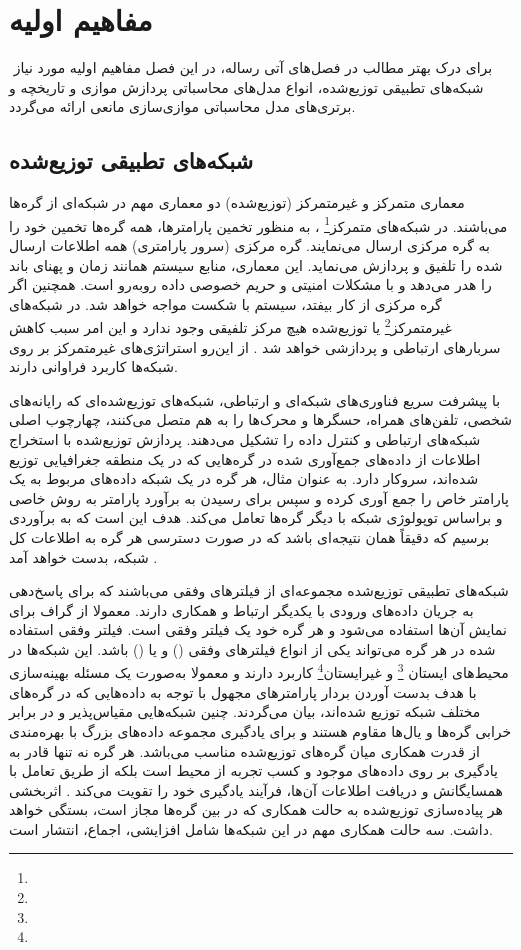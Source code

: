 \chapter{مفاهیم اولیه}
\newpage
‎\renewcommand{\baselinestretch}{2}\normalsize‎
\label{Basic concepts}
برای درک بهتر مطالب در فصل‌های آتی رساله، در این فصل مفاهیم اولیه مورد نیاز شبکه‌های تطبیقی توزیع‌شده، انواع مدل‌های محاسباتی پردازش موازی و تاریخچه و برتری‌های مدل محاسباتی موازی‌سازی مانعی ارائه می‌گردد. 


\section{شبکه‌های تطبیقی توزیع‌شده}
معماری متمرکز و غیرمتمرکز  (توزیع‌شده) دو معماری مهم در شبکه‌ای از گره‌ها می‌باشند. در شبکه‌های متمرکز\footnote{} ، به منظور تخمین پارامترها، همه گره‌ها تخمین خود را به گره مرکزی ارسال می‌نمایند. گره ‌مرکزی (سرور پارامتری) همه اطلاعات ارسال شده را تلفیق و پردازش می‌نماید. این معماری، منابع سیستم همانند زمان و پهنای باند را هدر می‌دهد و با مشکلات امنیتی و حریم خصوصی داده روبه‌رو است. همچنین اگر گره مرکزی از کار بیفتد، سیستم با شکست مواجه خواهد شد. در شبکه‌های غیرمتمرکز\footnote{} یا‌ توزیع‌شده هیچ مرکز تلفیقی وجود ندارد و این امر سبب کاهش سربارهای ارتباطی و پردازشی خواهد شد \cite{Sayed2013}. از این‌رو استراتژی‌های غیرمتمرکز بر روی شبکه‌ها کاربرد فراوانی دارند. 

با پیشرفت سریع فناوری‌های شبکه‌ای و ارتباطی، شبکه‌های توزیع‌شده‌ای که رایانه‌های شخصی، تلفن‌های همراه، حسگرها و محرک‌ها را به هم متصل می‌کنند، چهارچوب اصلی شبکه‌های ارتباطی و کنترل داده‌ را تشکیل می‌دهند. پردازش توزیع‌شده با استخراج اطلاعات از داده‌های جمع‌آوری شده در گره‌هایی که در یک منطقه جغرافیایی توزیع شده‌اند، سروکار دارد. به عنوان مثال، هر گره در یک شبکه داده‌های مربوط به یک پارامتر خاص را جمع آوری کرده و سپس برای رسیدن به برآورد پارامتر به روش خاصی و براساس توپولوژی شبکه با دیگر گره‌ها تعامل می‌کند. هدف این است که به برآوردی برسیم که دقیقاً همان نتیجه‌ای باشد که در صورت دسترسی هر گره به اطلاعات کل شبکه، بدست خواهد آمد \cite{Sayed2013}.  

شبکه‌های تطبیقی توزیع‌شده مجموعه‌ای از فیلترهای وفقی می‌باشند که برای پاسخ‌دهی به جریان داده‌های ورودی با یکدیگر ارتباط و همکاری دارند. معمولا از گراف برای نمایش آن‌ها استفاده می‌شود و هر گره خود یک فیلتر وفقی است. فیلتر وفقی استفاده شده در هر گره می‌تواند یکی از انواع فیلترهای وفقی  () و یا  () باشد. این شبکه‌ها در محیط‌های ایستان  \footnote{} و غیرایستان\footnote{}  کاربرد دارند و معمولا به‌صورت یک مسئله بهینه‌سازی با هدف بدست آوردن بردار پارامترهای مجهول با توجه به داده‌هایی که در گره‌های مختلف شبکه توزیع شده‌اند، بیان می‌گردند. چنین شبکه‌هایی مقیاس‌پذیر و در برابر خرابی گره‌ها و یال‌ها مقاوم هستند و برای یادگیری مجموعه داده‌های بزرگ با بهره‌مندی از قدرت همکاری میان گره‌های توزیع‌شده مناسب می‌باشد. هر گره نه تنها قادر به یادگیری بر روی داده‌های موجود و کسب تجربه از محیط است بلکه از طریق تعامل با همسایگانش و دریافت اطلاعات آن‌ها، فرآیند یادگیری خود را تقویت می‌کند \cite{Sayed2014}. اثربخشی هر پیاده‌سازی توزیع‌شده به حالت همکاری که در بین گره‌ها مجاز است، بستگی خواهد داشت. سه حالت همکاری مهم در این شبکه‌ها شامل افزایشی، اجماع، انتشار است. 


